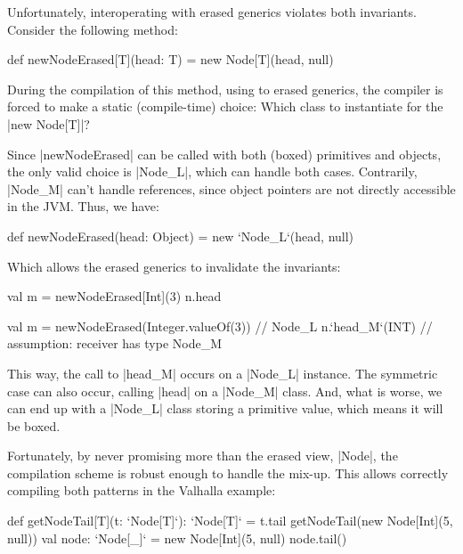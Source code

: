 Unfortunately, interoperating with erased generics violates both invariants. Consider the following method:

\begin{lstlisting-nobreak}
 def newNodeErased[T](head: T) =
   new Node[T](head, null)
\end{lstlisting-nobreak}

During the compilation of this method, using to erased generics, the compiler is forced to make a static (compile-time) choice: Which class to instantiate for the |new Node[T]|?

Since |newNodeErased| can be called with both (boxed) primitives and objects, the only valid choice is |Node_L|, which can handle both cases. Contrarily, |Node_M| can't handle references, since object pointers are not directly accessible in the JVM. Thus, we have: %

\begin{lstlisting-nobreak}
 def newNodeErased(head: Object) =
   new `Node_L`(head, null)
\end{lstlisting-nobreak}

Which allows the erased generics to invalidate the invariants:

\begin{lstlisting-nobreak}
 val m = newNodeErased[Int](3)
 n.head
\end{lstlisting-nobreak}


\begin{lstlisting-nobreak}
 val m = newNodeErased(Integer.valueOf(3))                  // Node_L
 n.`head_M`(INT)  // assumption: receiver has type Node_M
\end{lstlisting-nobreak}

This way, the call to |head_M| occurs on a |Node_L| instance. The symmetric case can also occur, calling |head| on a |Node_M| class. And, what is worse, we can end up with a |Node_L| class storing a primitive value, which means it will be boxed.

Fortunately, by never promising more than the erased view, |Node|, the compilation scheme is robust enough to handle the mix-up. This allows correctly compiling both patterns in the Valhalla example:

\begin{lstlisting-nobreak}
 def getNodeTail[T](t: `Node[T]`): `Node[T]` = t.tail
 getNodeTail(new Node[Int](5, null))
 val node: `Node[_]` = new Node[Int](5, null)
 node.tail()
\end{lstlisting-nobreak}

